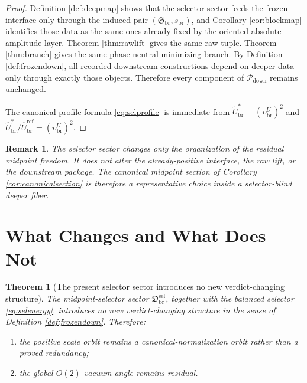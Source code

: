\documentclass[11pt]{article}
\newcommand{\RespShapeEq}{\widetilde U_{\mathrm{br}}^{\ast}}
\newcommand{\RespRawRef}{\widehat U_{\mathrm{br}}^{\mathrm{ref}}}
\newcommand{\RespRawEq}{\widehat U_{\mathrm{br}}^{\ast}}
\newcommand{\DownPkg}{\mathscr P_{\mathrm{down}}}
\newcommand{\ShapeTuple}{\mathfrak S_{\mathrm{br}}}
\newcommand{\ScaleMod}{s_{\mathrm{br}}}
\newcommand{\AbsEqAmp}{\upsilon_{\mathrm{br}}^{U}}
\newcommand{\MidSelSector}{\mathfrak D_{\mathrm{br}}^{\mathrm{sel}}}
\newtheorem{remark}{Remark}
\newtheorem{theorem}{Theorem}
\begin{document}
\begin{proof}
Definition \ref{def:deepmap} shows that the selector sector feeds the frozen interface only through the induced pair \((\ShapeTuple,\ScaleMod)\), and Corollary \ref{cor:blockmap} identifies those data as the same ones already fixed by the oriented absolute-amplitude layer. Theorem \ref{thm:rawlift} gives the same raw tuple. Theorem \ref{thm:branch} gives the same phase-neutral minimizing branch. By Definition \ref{def:frozendown}, all recorded downstream constructions depend on deeper data only through exactly those objects. Therefore every component of \(\DownPkg\) remains unchanged.

The canonical profile formula \eqref{eq:selprofile} is immediate from \(\RespShapeEq=(\AbsEqAmp)^{2}\) and \(\RespRawEq/\RespRawRef=(\AbsEqAmp)^{2}\).
\end{proof}

\begin{remark}
The selector sector changes only the organization of the residual midpoint freedom. It does not alter the already-positive interface, the raw lift, or the downstream package. The canonical midpoint section of Corollary \ref{cor:canonicalsection} is therefore a representative choice inside a selector-blind deeper fiber.
\end{remark}

\section{What Changes and What Does Not}

\begin{theorem}[The present selector sector introduces no new verdict-changing structure]
\label{thm:verdict}
The midpoint-selector sector \(\MidSelSector\), together with the balanced selector \eqref{eq:selenergy}, introduces no new verdict-changing structure in the sense of Definition \ref{def:frozendown}. Therefore:
\begin{enumerate}
    \item the positive scale orbit remains a canonical-normalization orbit rather than a proved redundancy;
    \item the global \(O(2)\) vacuum angle remains residual.
\end{enumerate}
\end{theorem}
\end{document}
